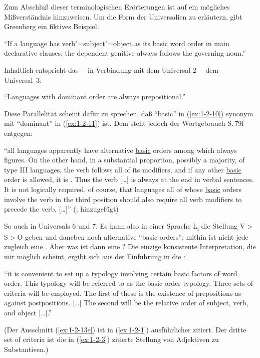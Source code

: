 \documentclass[output=paper]{langsci/langscibook}
\begin{document}
Zum Abschluß dieser terminologischen Erörterungen ist auf ein
mögliches Mißverständnis hinzuweisen. Um die Form der Universalien zu
erläutern, gibt Greenberg ein fiktives Beispiel:
\begin{exe}
\ex\label{ex:1-2-10}
"`If a language has verb"=subject"=object as its basic word order in main declarative clauses, the dependent genitive always follows the governing noun."'
\citep[74]{Greenberg1963}
\end{exe}
Inhaltlich entspricht das~-- in Verbindung mit dem Universal 2~– dem Universal~3:
\begin{exe}
\ex\label{ex:1-2-11}
"`Languages with dominant  order are always prepositional."' \citep[78]{Greenberg1963}
\end{exe}
Diese Parallelität scheint dafür zu sprechen, daß "`basic"' in (\ref{ex:1-2-10}) synonym mit "`dominant"' in (\ref{ex:1-2-11}) ist. Dem steht jedoch der Wortgebrauch S.\,79f entgegen:
\begin{exe}
\ex\label{ex:1-2-12}
"`all  languages apparently have alternative \underline{basic} orders among which
 always figures. On the other hand, in a substantial proportion, possibly
a majority, of type III languages, the verb follows all of its modifiers, and if
any other \underline{basic} order is allowed, it is . Thus the verb [\ldots] is always at
the end in verbal sentences. It is not logically required, of course, that languages all of whose \underline{basic} orders involve the verb in the third position should
also require all verb modifiers to precede the verb, [\ldots]"'
(\citealt[79]{Greenberg1963};  hinzugefügt)
\end{exe}
So auch in Universals 6 und 7. Es kann also in einer Sprache L\textsubscript{i} \zb die 
Stellung V$>$S$>$O geben und daneben noch alternative "`basic orders"'; mithin ist nicht
jede  zugleich eine . Aber was ist dann eine ? Die einzige konsistente Interpretation, die mir möglich scheint, ergibt sich aus
der Einführung in die :
\begin{exe}
\ex\label{ex:1-2-13}
\begin{xlist}
\ex\label{ex:1-2-13a}
 "`it is convenient to set up a typology involving certain basic factors of word
order.
\ex\label{ex:1-2-13b} This typology will be referred to as the basic order typology.
\ex\label{ex:1-2-13c} Three sets of criteria will be employed.
\ex\label{ex:1-2-13d} The first of these is the existence of prepositions as against postpositions.
[\ldots]
\ex\label{ex:1-2-13e} The second will be the relative order of subject, verb, and object [\ldots]."' \citep[76]{Greenberg1963}
\end{xlist}
\end{exe}
(Der Ausschnitt (\ref{ex:1-2-13e}) ist in (\ref{ex:1-2-1})
ausführlicher zitiert. Der dritte set of criteria ist die in
(\ref{ex:1-2-3}) zitierte Stellung von Adjektiven zu Substantiven.)
\end{document}
